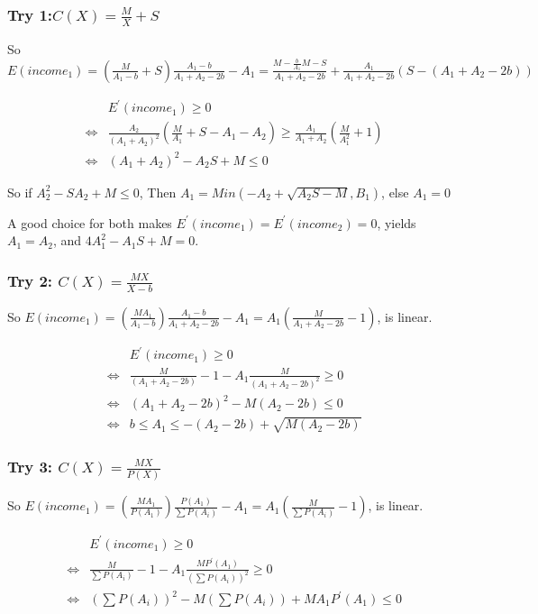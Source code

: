 \documentclass{article}
\begin{document}
\subsubsection{Try 1:$C(X)=\frac{M}{X}+S$}
\par So $E(income_1)=(\frac{M}{A_1-b}+S)\frac{A_1-b}{A_1+A_2-2b}-A_1=\frac{M-\frac{b}{A_1}M-S}{A_1+A_2-2b}+\frac{A_1}{A_1+A_2-2b}(S-(A_1+A_2-2b))$
 \par
 \begin{equation}
\begin{aligned}
&E^{'}(income_1)\ge 0
\\\Longleftrightarrow&\frac{A_2}{(A_1+A_2)^2}(\frac{M}{A_1}+S-A_1-A_2)\ge \frac{A_1}{A_1+A_2}(\frac{M}{A_1^2}+1)
\\\Longleftrightarrow&(A_1+A_2)^2-A_2S+M\le 0
\end{aligned}
\end{equation}
\par So if $A_2^2-SA_2+M\le 0$, Then $A_1=Min(-A_2+\sqrt{A_2S-M},B_1)$, else $A_1=0$
\par A good choice for both makes $E^{'}(income_1)=E^{'}(income_2)=0$, yields $A_1=A_2$, and $4A_1^2-A_1S+M=0$.
\subsubsection{Try 2: $C(X)=\frac{MX}{X-b}$}

\par So $E(income_1)=(\frac{MA_1}{A_1-b})\frac{A_1-b}{A_1+A_2-2b}-A_1=A_1(\frac{M}{A_1+A_2-2b}-1)$, is linear.
 \par
 \begin{equation}
\begin{aligned}
&E^{'}(income_1)\ge 0
\\\Longleftrightarrow&\frac{M}{(A_1+A_2-2b)}-1-A_1\frac{M}{(A_1+A_2-2b)^2}\ge 0
\\\Longleftrightarrow&(A_1+A_2-2b)^2-M(A_2-2b)\le 0
\\\Longleftrightarrow& b \le A_1 \le -(A_2-2b)+\sqrt{M(A_2-2b)}
\end{aligned}
\end{equation}
 \subsubsection{Try 3: $C(X)=\frac{MX}{P(X)}$}
\par So $E(income_1)=(\frac{MA_1}{P(A_1)})\frac{P(A_1)}{\sum P(A_i)}-A_1=A_1(\frac{M}{\sum P(A_i)}-1)$, is linear.
 \par
 \begin{equation}
\begin{aligned}
&E^{'}(income_1)\ge 0
\\\Longleftrightarrow&\frac{M}{\sum P(A_i)}-1-A_1\frac{MP^{'}(A_1)}{(\sum P(A_i))^2}\ge 0
\\\Longleftrightarrow&(\sum P(A_i))^2-M(\sum P(A_i))+MA_1P^{'}(A_1)\le 0
\end{aligned}
\end{equation}
\end{document}
